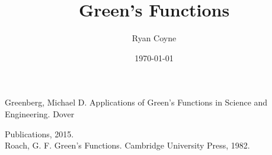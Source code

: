 \documentclass[12pt]{article}
\title{Green's Functions}
\author{Ryan Coyne}
\date{\today}
\numberwithin{equation}{section}
\numberwithin{figure}{section}
\begin{document}
\maketitle

\tableofcontents

\newpage









\appendix






Greenberg, Michael D. Applications of Green’s Functions in Science and Engineering. Dover

Publications, 2015.\\
Roach, G. F. Green’s Functions. Cambridge University Press, 1982.


\printindex
\end{document}
